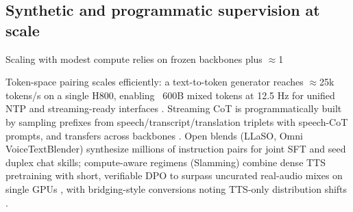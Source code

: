 \documentclass{article}
\begin{document}
\subsection{Synthetic and programmatic supervision at scale} \label{subsec:syntheticandprogrammaticsupervisionatscale}
Scaling with modest compute relies on frozen backbones plus $\approx$1%

Token-space pairing scales efficiently: a text-to-token generator reaches $\approx$25k tokens/s on a single H800, enabling ~600B mixed tokens at 12.5 Hz for unified NTP and streaming-ready interfaces \cite{zeng2024scalingspeechtextpretrainingsyntheticint}. Streaming CoT is programmatically built by sampling prefixes from speech/transcript/translation triplets with speech-CoT prompts, and transfers across backbones \cite{guo2025streamuniachievingstreamingspeechtransla}. Open blends (LLaSO, Omni VoiceTextBlender) synthesize millions of instruction pairs for joint SFT and seed duplex chat skills; compute-aware regimens (Slamming) combine dense TTS pretraining with short, verifiable DPO to surpass uncurated real-audio mixes on single GPUs \cite{peng2025voicetextblenderaugmentinglargelanguagem,fang2025llamaomniseamlessspeechinteractionlargel,maimon2025slammingtrainingspeechlanguagemodelonegp}, with bridging-style conversions noting TTS-only distribution shifts \cite{wang2023slmbridgethingapbetweenspeechtextfoundat}.
\end{document}

